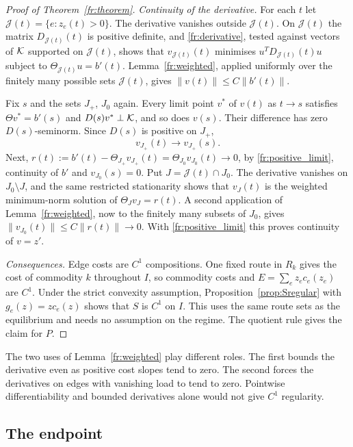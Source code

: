 \begin{proof}[Proof of Theorem~\ref{fr:theorem}]
\emph{Continuity of the derivative.} For each $t$ let $\mathcal J(t)=\{e:z_e(t)>0\}$. The derivative vanishes outside $\mathcal J(t)$. On $\mathcal J(t)$ the matrix $D_{\mathcal J(t)}(t)$ is positive definite, and \eqref{fr:derivative}, tested against vectors of $\mathcal K$ supported on $\mathcal J(t)$, shows that $v_{\mathcal J(t)}(t)$ minimises $u^TD_{\mathcal J(t)}(t)u$ subject to $\Theta_{\mathcal J(t)}u=b'(t)$. Lemma~\ref{fr:weighted}, applied uniformly over the finitely many possible sets $\mathcal J(t)$, gives $\|v(t)\|\le C\|b'(t)\|$.

Fix $s$ and the sets $J_+$, $J_0$ again. Every limit point $v^*$ of $v(t)$ as $t\to s$ satisfies $\Theta v^*=b'(s)$ and $D(s)v^*\perp\mathcal K$, and so does $v(s)$. Their difference has zero $D(s)$-seminorm. Since $D(s)$ is positive on $J_+$,
\begin{equation}\label{fr:positive_limit}
 v_{J_+}(t)\longrightarrow v_{J_+}(s).
\end{equation}
Next, $r(t):=b'(t)-\Theta_{J_+}v_{J_+}(t)=\Theta_{J_0}v_{J_0}(t)\to0$, by \eqref{fr:positive_limit}, continuity of $b'$ and $v_{J_0}(s)=0$. Put $J=\mathcal J(t)\cap J_0$. The derivative vanishes on $J_0\setminus J$, and the same restricted stationarity shows that $v_J(t)$ is the weighted minimum-norm solution of $\Theta_Jv_J=r(t)$. A second application of Lemma~\ref{fr:weighted}, now to the finitely many subsets of $J_0$, gives $\|v_{J_0}(t)\|\le C\|r(t)\|\to0$. With \eqref{fr:positive_limit} this proves continuity of $v=z'$.

\emph{Consequences.} Edge costs are $C^1$ compositions. One fixed route in $R_k$ gives the cost of commodity $k$ throughout $I$, so commodity costs and $E=\sum_e z_ec_e(z_e)$ are $C^1$. Under the strict convexity assumption, Proposition~\ref{prop:Sregular} with $g_e(z)=zc_e(z)$ shows that $S$ is $C^1$ on $I$. This uses the same route sets as the equilibrium and needs no assumption on the regime. The quotient rule gives the claim for $P$.
\end{proof}

The two uses of Lemma~\ref{fr:weighted} play different roles. The first bounds the derivative even as positive cost slopes tend to zero. The second forces the derivatives on edges with vanishing load to tend to zero. Pointwise differentiability and bounded derivatives alone would not give $C^1$ regularity.

\subsection{The endpoint}

